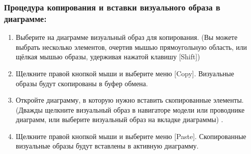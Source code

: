 \documentclass[a4paper,12pt]{extreport}
\begin{document}
\subsubsection*{Процедура копирования и вставки визуального образа в диаграмме:}
\begin{enumerate}
	\item Выберите на диаграмме визуальный образ для копирования. (Вы можете выбрать несколько
	элементов, очертив мышью прямоугольную область, или щёлкая мышью образы, удерживая
	нажатой клавишу [Shift])
	\item Щелкните правой кнопкой мыши и выберите меню [Copy]. Визуальные образы будут
	скопированы в буфер обмена.
	\item Откройте диаграмму, в которую нужно вставить скопированные элементы. (Дважды
	щелкните визуальный образ в навигаторе модели или проводнике диаграмм, или выберите
	визуальный образ на вкладке диаграммы) .
	\item Щелкните правой кнопкой мыши и выберите меню [Paste]. Скопированные визуальные
	образы будут вставлены в активную диаграмму.
\end{enumerate}
\end{document}
